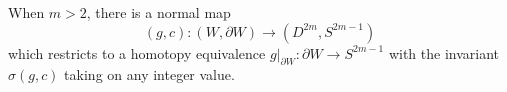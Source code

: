 \begin{definition}
\end{definition}

\begin{theorem}\label{thm:plumbing-theorem}
	When $m>2$, there is a normal map \[(g,c) : (W,\partial W) \to (D^{2m}, S^{2m-1})\] which restricts to a homotopy equivalence $g|_{\partial W} : \partial W \to  S^{2m-1}$ with the invariant $\sigma(g,c)$ taking on any integer value.
\end{theorem}

%
%
%
%
%
%
%
